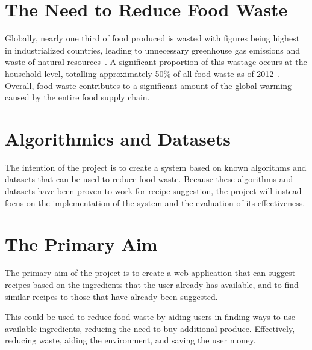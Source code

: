 {
\let\clearpage\relax

\section{The Need to Reduce Food Waste}
Globally, nearly one third of food produced is wasted with figures being highest
in industrialized countries, leading to unnecessary greenhouse gas emissions and
waste of natural resources~\cite{gustavsson_global_2011}. A significant proportion
of this wastage occurs at the household level, totalling approximately 50\% of all
food waste as of 2012~\cite{stenmarck_estimates_2016}. Overall, food waste contributes
to a significant amount of the global warming caused by the entire food supply
chain.~\cite{scherhaufer_environmental_2018}

\section{Algorithmics and Datasets}
The intention of the project is to create a system based on known algorithms and
datasets that can be used to reduce food waste. Because these algorithms and
datasets have been proven to work for recipe suggestion, the project will instead
focus on the implementation of the system and the evaluation of its effectiveness.

\section{The Primary Aim}
The primary aim of the project is to create a web application that can suggest
recipes based on the ingredients that the user already has available, and to
find similar recipes to those that have already been suggested.

This could be used to reduce food waste by aiding users in finding ways to use
available ingredients, reducing the need to buy additional produce. Effectively,
reducing waste, aiding the environment, and saving the user money.

} %
